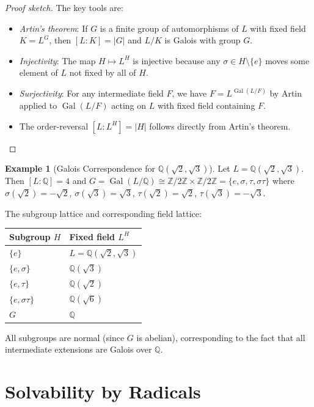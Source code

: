 \documentclass[12pt,a4paper]{amsart}
\theoremstyle{definition}
\newtheorem{example}[theorem]{Example}
\newcommand{\Q}{\mathbb{Q}}
\newcommand{\Z}{\mathbb{Z}}
\newcommand{\Gal}{\operatorname{Gal}}
\begin{document}
\begin{proof}[Proof sketch]
The key tools are:
\begin{itemize}
  \item \emph{Artin's theorem}: If $G$ is a finite group of automorphisms of $L$
        with fixed field $K = L^G$, then $[L:K] = |G|$ and $L/K$ is Galois with
        group $G$.
  \item \emph{Injectivity}: The map $H \mapsto L^H$ is injective because any
        $\sigma \in H \setminus \{e\}$ moves some element of $L$ not fixed by all
        of $H$.
  \item \emph{Surjectivity}: For any intermediate field $F$, we have
        $F = L^{\Gal(L/F)}$ by Artin applied to $\Gal(L/F)$ acting on $L$ with
        fixed field containing $F$.
  \item The order-reversal $[L:L^H] = |H|$ follows directly from Artin's theorem.
\end{itemize}
\end{proof}

\begin{example}[Galois Correspondence for $\Q(\sqrt{2},\sqrt{3})$]
Let $L = \Q(\sqrt{2},\sqrt{3})$. Then $[L:\Q] = 4$ and
$G = \Gal(L/\Q) \cong \Z/2\Z \times \Z/2\Z = \{e, \sigma, \tau, \sigma\tau\}$
where $\sigma(\sqrt{2}) = -\sqrt{2}$, $\sigma(\sqrt{3}) = \sqrt{3}$,
$\tau(\sqrt{2}) = \sqrt{2}$, $\tau(\sqrt{3}) = -\sqrt{3}$.

The subgroup lattice and corresponding field lattice:
\begin{center}
\begin{tabular}{ll}
\toprule
Subgroup $H$ & Fixed field $L^H$ \\
\midrule
$\{e\}$ & $L = \Q(\sqrt{2},\sqrt{3})$ \\
$\{e, \sigma\}$ & $\Q(\sqrt{3})$ \\
$\{e, \tau\}$ & $\Q(\sqrt{2})$ \\
$\{e, \sigma\tau\}$ & $\Q(\sqrt{6})$ \\
$G$ & $\Q$ \\
\bottomrule
\end{tabular}
\end{center}
All subgroups are normal (since $G$ is abelian), corresponding to the fact that
all intermediate extensions are Galois over $\Q$.
\end{example}

\section{Solvability by Radicals}
\end{document}
